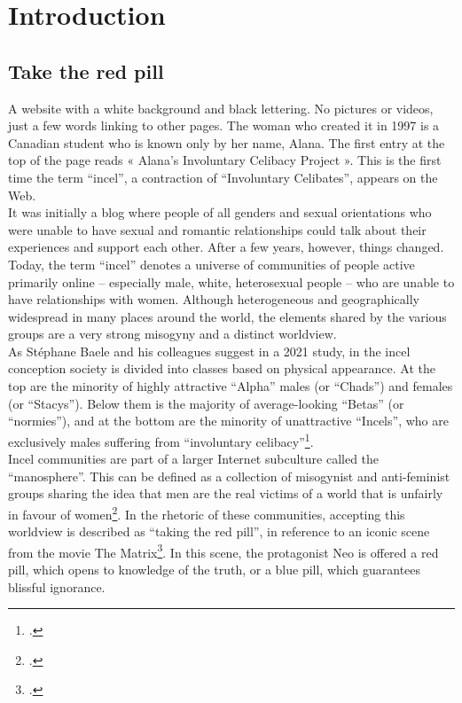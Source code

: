 \documentclass[a4paper,twoside,12pt, openany]{book}
\begin{document}
\mainmatter


\chapter{Introduction}

\section{Take the red pill}
A website with a white background and black lettering. No pictures or videos, just a few words linking to other pages. The woman who created it in 1997 is a Canadian student who is known only by her name, Alana. The first entry at the top of the page reads « Alana's Involuntary Celibacy Project ». This is the first time the term \enquote{incel}, a contraction of “Involuntary Celibates”, appears on the Web.\\
It was initially a blog where people of all genders and sexual orientations who were unable to have sexual and romantic relationships could talk about their experiences and support each other. After a few years, however, things changed.\\

Today, the term \enquote{incel} denotes a universe of communities of people active primarily online  – especially male, white, heterosexual people – who are unable to have relationships with women. Although heterogeneous and geographically widespread in many places around the world, the elements shared by the various groups are a very strong misogyny and a distinct worldview.
\\
As Stéphane Baele and his colleagues suggest in a 2021 study, in the incel conception society is divided into classes based on physical appearance. At the top are the minority of highly attractive “Alpha” males (or “Chads”) and females (or “Stacys”). Below them is the majority of average-looking “Betas” (or “normies”), and at the bottom are the minority of unattractive “Incels”, who are exclusively males suffering from “involuntary celibacy”\footcite{baele2021}.\\
Incel communities are part of a larger Internet subculture called the “manosphere”. This can be defined as a collection of misogynist and anti-feminist groups sharing the idea that men are the real victims of a world that is unfairly in favour of
women\footcite{sugiura2021}. In the rhetoric of these communities, accepting this worldview is described as “taking the red pill”, in reference to an iconic scene from the movie The Matrix\footcite{vanvalkenburgh2021}. In this scene, the protagonist Neo is offered a red pill, which opens to knowledge of the truth, or a blue pill, which guarantees blissful ignorance.
\end{document}
